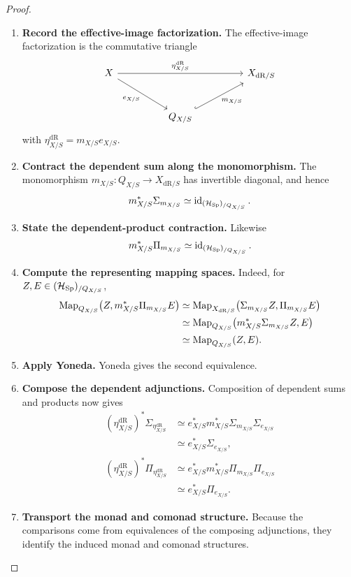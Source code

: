 \begin{proof}
\leavevmode
\begin{enumerate}[label=\textup{(\arabic*)}]
    \item \textbf{Record the effective-image factorization.}
The effective-image factorization is the commutative triangle
\[
\begin{tikzcd}[column sep=huge,row sep=large]
X \ar[rr,"\eta_{X/S}^{\mathrm{dR}}"]
  \ar[dr,"e_{X/S}"']
&& X_{\mathrm{dR}/S}\\
& Q_{X/S} \ar[ur,hook,"m_{X/S}"'] &
\end{tikzcd}
\]
with \(\eta_{X/S}^{\mathrm{dR}}=m_{X/S}e_{X/S}\).

    \item \textbf{Contract the dependent sum along the monomorphism.}
The monomorphism
\(m_{X/S}:Q_{X/S}\to X_{\mathrm{dR}/S}\) has invertible diagonal, and hence
\[
  m_{X/S}^*\Sigma_{m_{X/S}}
  \simeq
  \operatorname{id}_{(\mathcal H_{\operatorname{Sp}})_{/Q_{X/S}}}.
\]

    \item \textbf{State the dependent-product contraction.}
Likewise
\[
  m_{X/S}^*\Pi_{m_{X/S}}
  \simeq
  \operatorname{id}_{(\mathcal H_{\operatorname{Sp}})_{/Q_{X/S}}}.
\]

    \item \textbf{Compute the representing mapping spaces.}
Indeed, for \(Z,E\in(\mathcal H_{\operatorname{Sp}})_{/Q_{X/S}}\),
\[
\begin{aligned}
  \operatorname{Map}_{Q_{X/S}}
  \bigl(Z,m_{X/S}^*\Pi_{m_{X/S}}E\bigr)
  &\simeq
  \operatorname{Map}_{X_{\mathrm{dR}/S}}
  \bigl(\Sigma_{m_{X/S}}Z,\Pi_{m_{X/S}}E\bigr)\\
  &\simeq
  \operatorname{Map}_{Q_{X/S}}
  \bigl(m_{X/S}^*\Sigma_{m_{X/S}}Z,E\bigr)\\
  &\simeq
  \operatorname{Map}_{Q_{X/S}}(Z,E).
\end{aligned}
\]

    \item \textbf{Apply Yoneda.}
Yoneda gives the second equivalence.

    \item \textbf{Compose the dependent adjunctions.}
Composition of dependent sums and
products now gives
\[
\begin{aligned}
  (\eta_{X/S}^{\mathrm{dR}})^*
  \Sigma_{\eta_{X/S}^{\mathrm{dR}}}
  &\simeq
  e_{X/S}^*
  m_{X/S}^*
  \Sigma_{m_{X/S}}
  \Sigma_{e_{X/S}}\\
  &\simeq
  e_{X/S}^*\Sigma_{e_{X/S}},\\[0.4em]
  (\eta_{X/S}^{\mathrm{dR}})^*
  \Pi_{\eta_{X/S}^{\mathrm{dR}}}
  &\simeq
  e_{X/S}^*
  m_{X/S}^*
  \Pi_{m_{X/S}}
  \Pi_{e_{X/S}}\\
  &\simeq
  e_{X/S}^*\Pi_{e_{X/S}}.
\end{aligned}
\]

    \item \textbf{Transport the monad and comonad structure.}
Because the comparisons come from equivalences of the composing adjunctions,
they identify the induced monad and comonad structures.
\end{enumerate}
\end{proof}

